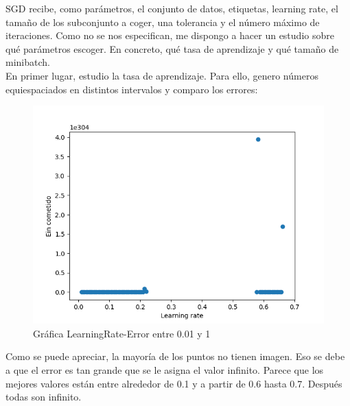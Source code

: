 SGD recibe, como parámetros, el conjunto de datos, etiquetas, learning rate, el tamaño de los subconjunto a coger, una tolerancia y el número máximo de iteraciones. Como no se nos especifican, me dispongo a hacer un estudio sobre qué parámetros escoger. En concreto, qué tasa de aprendizaje y qué tamaño de minibatch. \\

En primer lugar, estudio la tasa de aprendizaje. Para ello, genero números equiespaciados en distintos intervalos y comparo los errores:


\begin{figure}[H] %
	\centering
	\includegraphics[scale=0.6]{error1.png}  %
	\caption{Gráfica LearningRate-Error entre 0.01 y 1} 
	\label{fig:error1}
\end{figure}

Como se puede apreciar, la mayoría de los puntos no tienen imagen. Eso se debe a que el error es tan grande que se le asigna el valor infinito. Parece que los mejores valores están entre alrededor de 0.1 y a partir de 0.6 hasta 0.7. Después todas son infinito.

